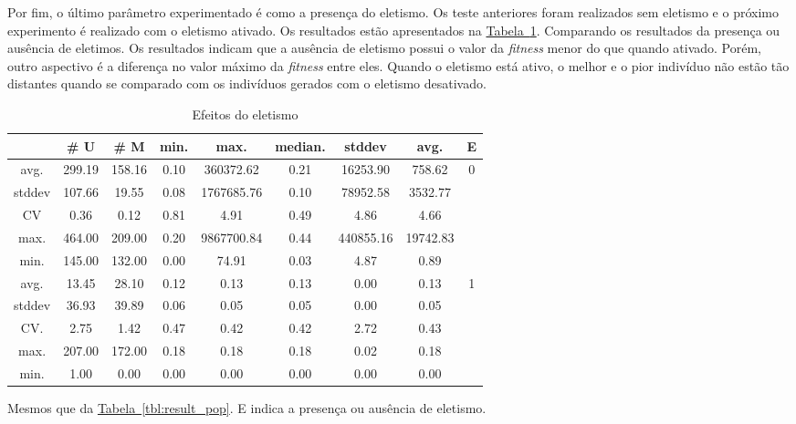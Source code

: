 \documentclass[a4paper]{article}
\begin{document}
Por fim, o último parâmetro experimentado é como a presença do eletismo. Os
teste anteriores foram realizados sem eletismo e o próximo experimento é
realizado com o eletismo ativado. Os resultados estão apresentados na
\hyperref[tbl:var_eletism]{Tabela~\ref*{tbl:var_eletism}}. Comparando os resultados
da presença ou ausência de eletimos. Os resultados indicam que a ausência de
eletismo possui o valor da \textit{fitness} menor do que quando ativado. Porém,
outro aspectivo é a diferença no valor máximo da \textit{fitness} entre eles.
Quando o eletismo está ativo, o melhor e o pior indivíduo não estão tão distantes
quando se comparado com os indivíduos gerados com o eletismo desativado.

\begin{table}
  \center
  \caption{Efeitos do eletismo}
  \label{tbl:var_eletism}
  \begin{tabular}{| c | c | c | c | c | c | c | c | c |}
    \hline
    &  \# U & \# M & min. & max. & median. & stddev & avg. & E \\ \hline \hline
avg. & 299.19 & 158.16 & 0.10 & 360372.62 & 0.21 & 16253.90 & 758.62 & \multirow{5}{1.5cm}{0} \\ \cline{1-8}
stddev & 107.66 & 19.55 & 0.08 & 1767685.76 & 0.10 & 78952.58 & 3532.77 & \\ \cline{1-8}
CV & 0.36 & 0.12 & 0.81 & 4.91 & 0.49 & 4.86 & 4.66 & \\ \cline{1-8}
max. & 464.00 & 209.00 & 0.20 & 9867700.84 & 0.44 & 440855.16 & 19742.83 & \\ \cline{1-8}
min. & 145.00 & 132.00 & 0.00 & 74.91 & 0.03 & 4.87 & 0.89 & \\ \hline \hline
avg. & 13.45 & 28.10 & 0.12 & 0.13 & 0.13 & 0.00 & 0.13 & \multirow{5}{1.5cm}{1} \\ \cline{1-8}
stddev & 36.93 & 39.89 & 0.06 & 0.05 & 0.05 & 0.00 & 0.05 & \\ \cline{1-8}
CV. & 2.75 & 1.42 & 0.47 & 0.42 & 0.42 & 2.72 & 0.43 & \\ \cline{1-8}
max. & 207.00 & 172.00 & 0.18 & 0.18 & 0.18 & 0.02 & 0.18 & \\ \cline{1-8}
min. & 1.00 & 0.00 & 0.00 & 0.00 & 0.00 & 0.00 & 0.00 & \\ \hline 
  \end{tabular}
    \begin{minipage}{0.9\textwidth}
    {\center \footnotesize
      Mesmos que da \hyperref[tbl:result_pop]{Tabela~\ref*{tbl:result_pop}}.
      E indica a presença ou ausência de eletismo.
    }
  \end{minipage}
\end{table}
\end{document}
